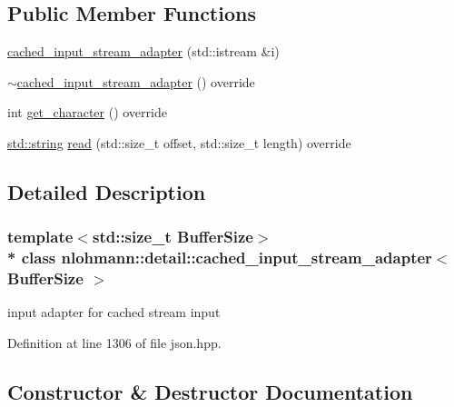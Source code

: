 \subsection*{Public Member Functions}
\begin{DoxyCompactItemize}
\item 
\hyperlink{classnlohmann_1_1detail_1_1cached__input__stream__adapter_a4827c5bf63460dc04ce04d97d52d73b1}{cached\+\_\+input\+\_\+stream\+\_\+adapter} (std\+::istream \&i)
\item 
\hyperlink{classnlohmann_1_1detail_1_1cached__input__stream__adapter_a81ed6a4a86aee8d2cdb21a84a62744bb}{$\sim$cached\+\_\+input\+\_\+stream\+\_\+adapter} () override
\item 
int \hyperlink{classnlohmann_1_1detail_1_1cached__input__stream__adapter_a4a6fc864751cf727b134f1c2bf31b523}{get\+\_\+character} () override
\item 
\hyperlink{namespacenlohmann_1_1detail_a90aa5ef615aa8305e9ea20d8a947980fab45cffe084dd3d20d928bee85e7b0f21}{std\+::string} \hyperlink{classnlohmann_1_1detail_1_1cached__input__stream__adapter_ab9531a66a29685ec87646e99b516c263}{read} (std\+::size\+\_\+t offset, std\+::size\+\_\+t length) override
\end{DoxyCompactItemize}


\subsection{Detailed Description}
\subsubsection*{template$<$std\+::size\+\_\+t Buffer\+Size$>$\\*
class nlohmann\+::detail\+::cached\+\_\+input\+\_\+stream\+\_\+adapter$<$ Buffer\+Size $>$}

input adapter for cached stream input 

Definition at line 1306 of file json.\+hpp.



\subsection{Constructor \& Destructor Documentation}

